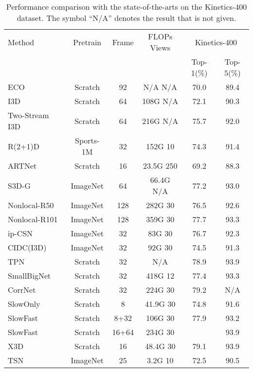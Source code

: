 \documentclass[journal]{IEEEtran}
\begin{document}
\begin{table*}
\caption{Performance comparison with the state-of-the-arts on the Kinetics-400 dataset. The symbol ``N/A” denotes the result that is not given.}
\label{tab:sotak}
\centering
\begin{tabular}{l|c|c|c|c|c}
\hline
Method                            & Pretrain   & Frame & FLOPs  Views   & \multicolumn{2}{c}{Kinetics-400}  \\
                                      &  &       &                            & Top-1(\%)          & Top-5(\%)           \\ \hline
ECO~\cite{zolfaghari2018eco}  & Scratch  & 92    & N/A  N/A             & 70.0         & 89.4                       \\
I3D~\cite{carreira2017quo}            &  Scratch      & 64       & 108G  N/A  & 72.1  & 90.3 \\
Two-Stream I3D~\cite{carreira2017quo} &  Scratch      & 64       & 216G  N/A  & 75.7  & 92.0 \\
R(2+1)D~\cite{tran2018closer}  & Sports-1M & 32     & 152G  10    & 74.3           & 91.4          \\
ARTNet~\cite{wang2018appearance}  &  Scratch      & 16        & 23.5G  250    & 69.2  & 88.3 \\
S3D-G~\cite{xie2018rethinking}  &   ImageNet       & 64       & 66.4G  N/A & 77.2  & 93.0 \\
Nonlocal-R50~\cite{NonLocal2018}       &   ImageNet       & 128       & 282G  30  & 76.5  & 92.6 \\
Nonlocal-R101~\cite{NonLocal2018}       &   ImageNet       & 128       & 359G  30       & 77.7  & 93.3 \\
ip-CSN~\cite{tran2019video}       &   ImageNet       & 32       & 83G  30    & 76.7  & 92.3 \\
CIDC(I3D)~\cite{li2020directional}  & ImageNet & 32    & 92G  30      & 74.5           & 91.3 \\
TPN~\cite{yang2020temporal}     &  Scratch      & 32        & N/A       & 78.9  & 93.9 \\
SmallBigNet~\cite{li2020smallbignet}  & Scratch       &32       &  418G  12    & 77.4  & 93.3 \\
CorrNet~\cite{wang2020video}   &Scratch           & 32    & 224G  30       & 79.2           & N/A           \\
SlowOnly~\cite{feichtenhofer2019slowfast}     &  Scratch     &8        & 41.9G  30      & 74.8  & 91.6 \\
SlowFast~\cite{feichtenhofer2019slowfast}     &  Scratch      &8+32        & 106G  30    & 77.9  & 93.2 \\
SlowFast~\cite{feichtenhofer2019slowfast}     &  Scratch      &16+64        & 234G  30   &   & 93.9 \\
X3D~\cite{feichtenhofer2020x3d}       &  Scratch      &16        & 48.4G  30      & 79.1  & 93.9 \\
\hline
TSN~\cite{wang2016temporal}  & ImageNet & 25     & 3.2G  10       & 72.5           & 90.5          \\



\end{tabular}
\end{table*}
\end{document}

